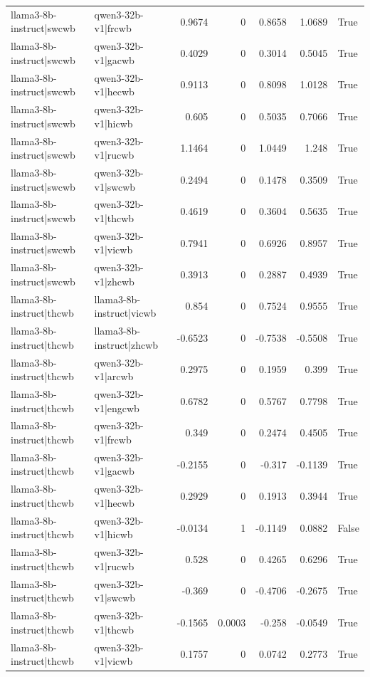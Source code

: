 \begin{table}
\begin{tabular}{l l r r r r l}
llama3-8b-instruct|swcwb & qwen3-32b-v1|frcwb & 0.9674 & 0 & 0.8658 & 1.0689 & True \\
llama3-8b-instruct|swcwb & qwen3-32b-v1|gacwb & 0.4029 & 0 & 0.3014 & 0.5045 & True \\
llama3-8b-instruct|swcwb & qwen3-32b-v1|hecwb & 0.9113 & 0 & 0.8098 & 1.0128 & True \\
llama3-8b-instruct|swcwb & qwen3-32b-v1|hicwb & 0.605 & 0 & 0.5035 & 0.7066 & True \\
llama3-8b-instruct|swcwb & qwen3-32b-v1|rucwb & 1.1464 & 0 & 1.0449 & 1.248 & True \\
llama3-8b-instruct|swcwb & qwen3-32b-v1|swcwb & 0.2494 & 0 & 0.1478 & 0.3509 & True \\
llama3-8b-instruct|swcwb & qwen3-32b-v1|thcwb & 0.4619 & 0 & 0.3604 & 0.5635 & True \\
llama3-8b-instruct|swcwb & qwen3-32b-v1|vicwb & 0.7941 & 0 & 0.6926 & 0.8957 & True \\
llama3-8b-instruct|swcwb & qwen3-32b-v1|zhcwb & 0.3913 & 0 & 0.2887 & 0.4939 & True \\
llama3-8b-instruct|thcwb & llama3-8b-instruct|vicwb & 0.854 & 0 & 0.7524 & 0.9555 & True \\
llama3-8b-instruct|thcwb & llama3-8b-instruct|zhcwb & -0.6523 & 0 & -0.7538 & -0.5508 & True \\
llama3-8b-instruct|thcwb & qwen3-32b-v1|arcwb & 0.2975 & 0 & 0.1959 & 0.399 & True \\
llama3-8b-instruct|thcwb & qwen3-32b-v1|engcwb & 0.6782 & 0 & 0.5767 & 0.7798 & True \\
llama3-8b-instruct|thcwb & qwen3-32b-v1|frcwb & 0.349 & 0 & 0.2474 & 0.4505 & True \\
llama3-8b-instruct|thcwb & qwen3-32b-v1|gacwb & -0.2155 & 0 & -0.317 & -0.1139 & True \\
llama3-8b-instruct|thcwb & qwen3-32b-v1|hecwb & 0.2929 & 0 & 0.1913 & 0.3944 & True \\
llama3-8b-instruct|thcwb & qwen3-32b-v1|hicwb & -0.0134 & 1 & -0.1149 & 0.0882 & False \\
llama3-8b-instruct|thcwb & qwen3-32b-v1|rucwb & 0.528 & 0 & 0.4265 & 0.6296 & True \\
llama3-8b-instruct|thcwb & qwen3-32b-v1|swcwb & -0.369 & 0 & -0.4706 & -0.2675 & True \\
llama3-8b-instruct|thcwb & qwen3-32b-v1|thcwb & -0.1565 & 0.0003 & -0.258 & -0.0549 & True \\
llama3-8b-instruct|thcwb & qwen3-32b-v1|vicwb & 0.1757 & 0 & 0.0742 & 0.2773 & True \\

\end{tabular}
\end{table}
